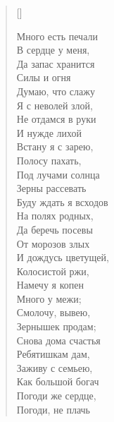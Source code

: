 \settowidth{\versewidth}{Много есть печали}
\begin{verse}[\versewidth]
\begin{altverse}
Много есть печали\\
В сердце у меня,\\
Да запас хранится\\
Силы и огня\ldotst\\
Думаю, что слажу\\
Я с неволей злой,\\
Не отдамся в руки\\
И нужде лихой\ldotst\\
Встану я с зарею,\\
Полосу пахать,\\
Под лучами солнца\\
Зерны рассевать\ldotst\\
Буду ждать я всходов\\
На полях родных,\\
Да беречь посевы\\
От морозов злых\ldotst\\
И дождусь цветущей,\\
Колосистой ржи,\\
Намечу я копен\\
Много у межи;\\
Смолочу, вывею,\\
Зернышек продам;\\
Снова дома счастья\\
Ребятишкам дам,\\
Заживу с семьею,\\
Как большой богач\ldotst\\
Погоди же сердце,\\
Погоди, не плачь\ldotst
\end{altverse}
\end{verse}

\newpage
\vspace*{0cm}


